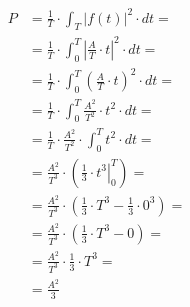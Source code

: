 \begin{task}
\begin{align*}
P&=\frac{1}{T} \cdot \int_{T}^{}\left|f(t)\right|^2 \cdot dt=\\
 &=\frac{1}{T} \cdot \int_{0}^{T}\left|\frac{A}{T}\cdot t \right|^2 \cdot dt=\\ 
 &=\frac{1}{T} \cdot \int_{0}^{T}\left(\frac{A}{T}\cdot t \right)^2 \cdot dt=\\ 
 &=\frac{1}{T} \cdot \int_{0}^{T}\frac{A^2}{T^2}\cdot t^2 \cdot dt=\\ 
 &=\frac{1}{T} \cdot \frac{A^2}{T^2}\cdot \int_{0}^{T} t^2 \cdot dt=\\ 
 &=\frac{A^2}{T^3}\cdot \left(\left. \frac{1}{3}\cdot t^3 \right|_{0}^{T}\right)=\\ 
 &=\frac{A^2}{T^3}\cdot \left(\frac{1}{3}\cdot T^3  - \frac{1}{3}\cdot 0^3 \right)=\\
 &=\frac{A^2}{T^3}\cdot \left(\frac{1}{3}\cdot T^3  - 0 \right)=\\
 &=\frac{A^2}{T^3}\cdot \frac{1}{3}\cdot T^3=\\
 &=\frac{A^2}{3}
\end{align*}

\end{task}